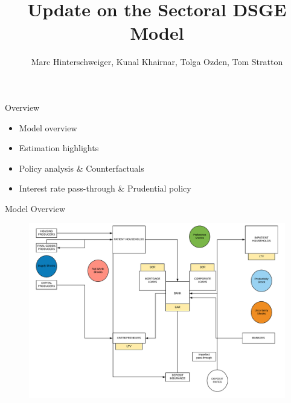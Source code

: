 \documentclass[8pt,aspectratio=169]{beamer}
\title{\bf Update on the Sectoral DSGE Model}
\author{Marc Hinterschweiger, Kunal Khairnar, Tolga Ozden, Tom Stratton}
\numberwithin{equation}{section}
\begin{document}
\titlepage
\begin{frame}{Overview}




\begin{itemize}

\item Model overview
\vspace{5 mm}
\item Estimation highlights
\vspace{5 mm}
\item Policy analysis \& Counterfactuals
\vspace{5 mm}
\item Interest rate pass-through \& Prudential policy

\end{itemize}


\end{frame}


\begin{frame}{Model Overview}

\begin{figure}
\includegraphics[scale=0.45]{3d_model_overview.pdf}
\end{figure}

\end{frame}
\end{document}
